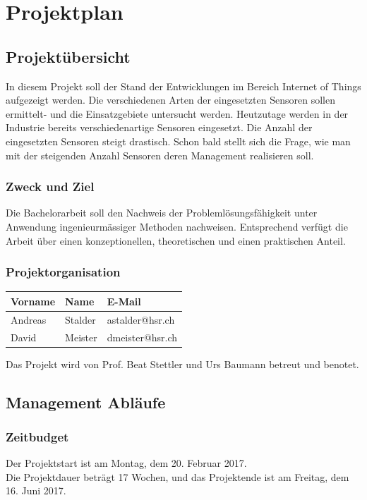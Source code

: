 \chapter{Projektplan}
\section{Projektübersicht}
In diesem Projekt soll der Stand der Entwicklungen im Bereich \glqq Internet of Things\grqq{} aufgezeigt werden. Die verschiedenen Arten der eingesetzten Sensoren sollen ermittelt- und die Einsatzgebiete untersucht werden. Heutzutage werden in der Industrie bereits verschiedenartige Sensoren eingesetzt. Die Anzahl der eingesetzten Sensoren steigt drastisch. Schon bald stellt sich die Frage, wie man mit der steigenden Anzahl Sensoren deren Management realisieren soll.
\subsection{Zweck und Ziel}
Die Bachelorarbeit soll den Nachweis der Problemlösungsfähigkeit unter Anwendung
ingenieurmässiger Methoden nachweisen. Entsprechend verfügt die Arbeit über einen
konzeptionellen, theoretischen und einen praktischen Anteil.
\subsection{Projektorganisation}
\begin{table}[H]
\centering
    \begin{tabular}{@{} l l l@{}}    
    {Vorname} & {Name} & {E-Mail} \\ \midrule
    Andreas & Stalder & astalder@hsr.ch \\ \addlinespace
    David & Meister & dmeister@hsr.ch \\ \bottomrule
    \end{tabular}
\end{table} 

Das Projekt wird von Prof. Beat Stettler und Urs Baumann betreut und benotet.
\section{Management Abläufe}
\subsection{Zeitbudget}
Der Projektstart ist am Montag, dem 20. Februar 2017. \\
Die Projektdauer beträgt 17 Wochen, und das Projektende ist am Freitag, dem 16. Juni 2017. \\

